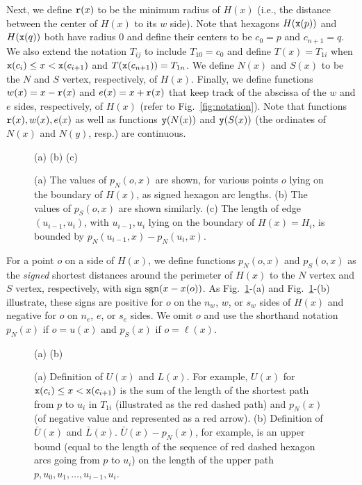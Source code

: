 Next, we define ${\tt r}(x)$ to be the minimum radius of $H(x)$ (i.e., the
distance between the center of $H(x)$ to its $w$ side). Note that hexagons 
$H({\tt x}(p))$ and
$H({\tt x}(q))$ both have radius $0$ and define their centers to be $c_0 = p$
and $c_{n+1}=q$. We also extend the notation $T_{ij}$ to include $T_{10} = c_0$
and define $T(x) = T_{1i}$ when ${\tt x}(c_i) \leq x < {\tt x}(c_{i+1})$ and
$T({\tt x}(c_{n+1}))=T_{1n}$.
We define $N(x)$ and $S(x)$ to be the $N$ and $S$ vertex, respectively, of
$H(x)$. Finally, we define functions $w(x) = x-{\tt r}(x)$ and
$e(x) = x + {\tt r}(x)$ that keep track of the abscissa of the $w$ and $e$
sides, respectively, of $H(x)$ (refer to Fig.~\ref{fig:notation}). Note that
functions ${\tt r}(x), w(x), e(x)$ as well as functions ${\tt y}(N(x))$ and
${\tt y}(S(x))$ (the ordinates of $N(x)$ and $N(y)$, resp.) are continuous. 


\begin{figure}[!b]
\dNdS

\vspace{0.3cm}
\hspace{1.45cm} (a) \hspace{4.35cm} (b) \hspace{4.55cm} (c)
\caption{(a) The values of $p_N(o, x)$ are shown, for various points $o$
lying on the boundary of $H(x)$, as signed hexagon arc lengths. (b) The 
values of $p_S(o, x)$ are shown similarly. (c) The length of edge
$(u_{i-1},u_i)$, with $u_{i-1},u_i$ lying on the boundary of $H(x)=H_i$, 
is bounded by $p_N(u_{i-1}, x) - p_N(u_i,x)$.}
\label{fig:dNdS}
\end{figure}


For a point $o$ on a side of $H(x)$, we define functions $p_N(o, x)$ and 
$p_S(o, x)$ as the {\em signed} shortest distances around the perimeter of
$H(x)$ to the $N$ vertex and $S$ vertex, respectively, with sign 
$\operatorname{sgn}(x - x(o))$. As Fig.~\ref{fig:dNdS}-(a) and Fig.~\ref{fig:dNdS}-(b)
illustrate, these signs are positive for $o$ on the $n_w$, $w$, or $s_w$
sides of $H(x)$ and negative for $o$ on $n_e$, $e$, or $s_e$ sides. 
We omit $o$ and use the shorthand notation $p_N(x)$ if $o = u(x)$ and
$p_S(x)$ if $o = \ell(x)$. 

\begin{figure}
\begin{center}\UandL

\vspace{0.6cm}
(a) \hspace{6cm} (b)
\end{center}
\caption{(a) Definition of $U(x)$ and $L(x)$. For example, $U(x)$ for 
${\tt x}(c_i) \leq x < {\tt x}(c_{i+1})$ is the sum
of the length of the shortest path from $p$ to $u_i$ in $T_{1i}$ 
(illustrated as the red dashed path) and $p_N(x)$ (of negative value and 
represented as a red arrow). (b) Definition of $\bar{U}(x)$ and $\bar{L}(x)$. $\bar{U}(x) - p_N(x)$,
for example, is an upper bound (equal to the length of the 
sequence of red dashed
hexagon arcs going from $p$ to $u_i$) on the length
of the upper path $p, u_0, u_1, \dots, u_{i-1}, u_i$.}
\label{fig:UandL}
\end{figure}



